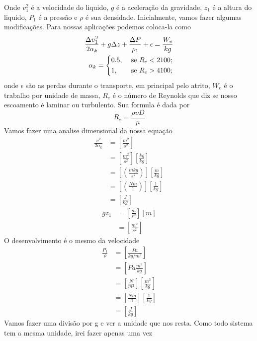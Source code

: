 Onde \(v_1^{2} \) é a velocidade do liquido, \(g\) é a aceleração da gravidade, \(z_1\) é a altura
do liquido, \(P_1\) é a pressão e \(\rho \) é sua densidade. Inicialmente, vamos fazer algumas
modificações. Para nossas aplicações podemos coloca-la como
\begin{align}\label{eq: EQ das bombas inc}
    \frac{\Delta  \upsilon _ 1^{2}}{2\alpha_{k}}+g \Delta  z+\frac{\Delta  P}{\rho_{1} }+\epsilon =\frac{W_e}{kg} \\
    \alpha_k= \notag
    \begin{dcases}
        0.5, &\text{ se } R_e<2100 ;\\
        1, &\text{ se } R_e>4100 ;\\
    \end{dcases}
\end{align}
onde \(\epsilon \) são as perdas durante o transporte, em principal pelo atrito, \(W_e\) é o
trabalho por unidade de massa, \(R_e\) é o número de Reynolds que diz se nosso escoamento é laminar
ou turbulento. Sua formula é dada por 
\begin{equation}\label{eq:Num de Reynolds}
    R_e=\frac{\rho \upsilon D}{\mu }    
\end{equation}
Vamos fazer uma analise dimensional da nossa equação
\begin{align}
    \frac{\upsilon^{2}}{2\alpha_{k}}&=[\frac{m^{2} }{s ^{2} }]\\
    &=[\frac{m^{2} }{s ^{2} }][\frac{kg}{kg}]\\
    &=[(\frac{mkg}{s ^{2}})][\frac{m}{kg}]\\
    &=[(\frac{Nm}{1})][\frac{1}{kg}]\\
    &=[\frac{J}{kg}]
\end{align}
\begin{align}
    gz_1&=[\frac{m}{s^{2} }][m]\\
    &=[\frac{m^{2} }{s ^{2} }]
\end{align}
O desenvolvimento é o mesmo da velocidade
\begin{align}
    \frac{P_1}{\rho }&=[\frac{Pa}{kg/m^{3}}]\\
    &=[Pa\frac{m^{3}}{kg}]\\
    &=[\frac{N}{m^{2} }][\frac{m^{3}}{kg}]\\
    &=[\frac{Nm}{1}][\frac{1}{kg}]\\
    &=[\frac{J}{kg}]
\end{align}
Vamos fazer uma divisão por g e ver a unidade que nos resta. Como todo sistema tem a mesma unidade,
irei fazer apenas uma vez
